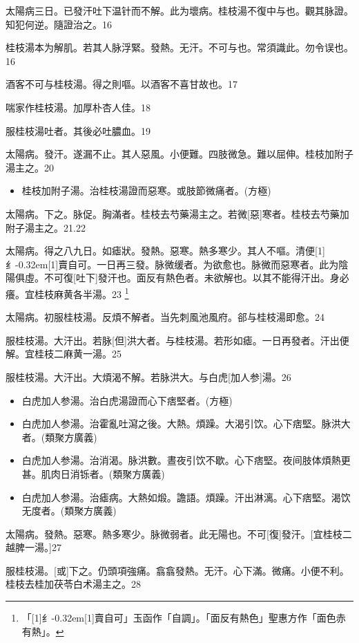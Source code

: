 \documentclass[11pt,oneside,b5paper]{ctexbook}
\begin{document}
\begin{flushleft}
太陽病三日。已發汗吐下温针而不解。此为壞病。桂枝湯不復中与也。觀其脉證。知犯何逆。隨證治之。16

桂枝湯本为解肌。若其人脉浮緊。發熱。无汗。不可与也。常須識此。勿令误也。16

酒客不可与桂枝湯。得之則嘔。以酒客不喜甘故也。17

喘家作桂枝湯。加厚朴杏人佳。18

服桂枝湯吐者。其後必吐膿血。19

太陽病。發汗。遂漏不止。其人惡風。小便難。四肢微急。難以屈伸。桂枝加附子湯主之。20

\begin{itemize}
\item 桂枝加附子湯。治桂枝湯證而惡寒。或肢節微痛者。(方極)
\end{itemize}

太陽病。下之。脉促。胸滿者。桂枝去芍藥湯主之。若微[惡]寒者。桂枝去芍藥加附子湯主之。21.22

太陽病。得之八九日。如瘧狀。發熱。惡寒。熱多寒少。其人不嘔。清便{\hbox{\scalebox{0.6}[1]{纟}\kern-0.32em\scalebox{0.7}[1]{賣}}}自可。一日再三發。脉微缓者。为欲愈也。脉微而惡寒者。此为陰陽俱虛。不可復[吐下]發汗也。面反有熱色者。未欲解也。以其不能得汗出。身必癢。宜桂枝麻黄各半湯。23
\footnote{「{\hbox{\scalebox{0.6}[1]{纟}\kern-0.32em\scalebox{0.7}[1]{賣}}}自可」玉函作「自調」。「面反有熱色」聖惠方作「面色赤有熱」。}

太陽病。初服桂枝湯。反煩不解者。当先刺風池風府。郤与桂枝湯即愈。24

服桂枝湯。大汗出。若脉[但]洪大者。与桂枝湯。若形如瘧。一日再發者。汗出便解。宜桂枝二麻黄一湯。25

服桂枝湯。大汗出。大煩渴不解。若脉洪大。与白虎[加人参]湯。26

\begin{itemize}
\item 白虎加人参湯。治白虎湯證而心下痞堅者。(方極)
\item 白虎加人参湯。治霍亂吐瀉之後。大熱。煩躁。大渴引饮。心下痞堅。脉洪大者。(類聚方廣義)
\item 白虎加人参湯。治消渴。脉洪數。晝夜引饮不歇。心下痞堅。夜间肢体煩熱更甚。肌肉日消铄者。(類聚方廣義)
\item 白虎加人参湯。治瘧病。大熱如煅。譫語。煩躁。汗出淋漓。心下痞堅。渴饮无度者。(類聚方廣義)
\end{itemize}

太陽病。發熱。惡寒。熱多寒少。脉微弱者。此无陽也。不可[復]發汗。[宜桂枝二越脾一湯。]27

服桂枝湯。[或]下之。仍頭項強痛。翕翕發熱。无汗。心下滿。微痛。小便不利。桂枝去桂加茯苓白术湯主之。28


\end{flushleft}
\end{document}
